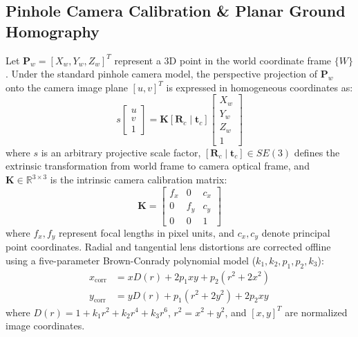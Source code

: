 \documentclass[journal]{IEEEtran}
\begin{document}
\subsection{Pinhole Camera Calibration \& Planar Ground Homography}
Let $\mathbf{P}_w = [X_w, Y_w, Z_w]^T$ represent a 3D point in the world coordinate frame $\{W\}$. Under the standard pinhole camera model, the perspective projection of $\mathbf{P}_w$ onto the camera image plane $[u, v]^T$ is expressed in homogeneous coordinates as:
\begin{equation}
s \begin{bmatrix} u \\ v \\ 1 \end{bmatrix} = \mathbf{K} \left[ \mathbf{R}_{c} \mid \mathbf{t}_{c} \right] \begin{bmatrix} X_w \\ Y_w \\ Z_w \\ 1 \end{bmatrix}
\end{equation}
where $s$ is an arbitrary projective scale factor, $[\mathbf{R}_c \mid \mathbf{t}_c] \in SE(3)$ defines the extrinsic transformation from world frame to camera optical frame, and $\mathbf{K} \in \mathbb{R}^{3\times3}$ is the intrinsic camera calibration matrix:
\begin{equation}
\mathbf{K} = \begin{bmatrix}
f_x & 0 & c_x \\
0 & f_y & c_y \\
0 & 0 & 1
\end{bmatrix}
\end{equation}
where $f_x, f_y$ represent focal lengths in pixel units, and $c_x, c_y$ denote principal point coordinates. Radial and tangential lens distortions are corrected offline using a five-parameter Brown-Conrady polynomial model ($k_1, k_2, p_1, p_2, k_3$):
\begin{align}
x_{\text{corr}} &= x D(r) + 2 p_1 x y + p_2 (r^2 + 2 x^2) \\
y_{\text{corr}} &= y D(r) + p_1 (r^2 + 2 y^2) + 2 p_2 x y
\end{align}
where $D(r) = 1 + k_1 r^2 + k_2 r^4 + k_3 r^6$, $r^2 = x^2 + y^2$, and $[x, y]^T$ are normalized image coordinates.
\end{document}
